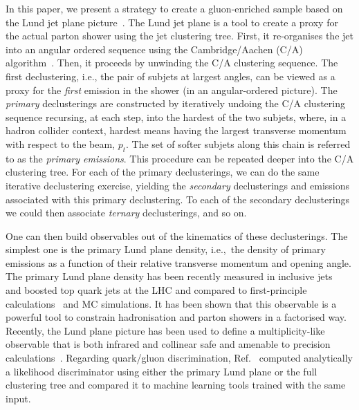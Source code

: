 \documentclass[a4paper,11pt]{article}
\begin{document}
In this paper, we present a strategy to create a gluon-enriched sample based on the Lund jet plane picture~\cite{Andersson:1988gp,Dreyer:2018nbf}. The Lund jet plane is a tool to create a proxy for the actual parton shower using the jet clustering tree. First, it re-organises the jet into an angular ordered sequence using the Cambridge/Aachen (C/A) algorithm~\cite{Dokshitzer:1997in}. Then, it proceeds by unwinding the C/A clustering sequence. The first declustering, i.e., the pair of subjets at largest angles, can be viewed as a proxy for the \textit{first} emission in the shower (in an angular-ordered picture). 
%
The \textit{primary} declusterings are constructed by iteratively undoing the C/A clustering sequence recursing, at each step, into the hardest of the two subjets, where, in a hadron collider context, hardest means having the largest transverse momentum with respect to the beam, $p_t$. The set of softer subjets along this chain is referred to as the \textit{primary emissions}.
%
This procedure can be repeated deeper into the C/A clustering tree. For each of the primary declusterings, we can do the same iterative declustering exercise, yielding the \textit{secondary} declusterings and emissions associated with this primary declustering. To each of the secondary declusterings we could then associate \textit{ternary} declusterings, and so on.

One can then build observables out of the kinematics of these declusterings. The simplest one is the primary Lund plane density, i.e.,\ the density of primary emissions as a function of their relative transverse momentum and opening angle. The primary Lund plane density has been recently measured in inclusive jets~\cite{ATLAS:2020bbn,CMS:2023lpp} and boosted top quark jets \cite{ATLAS:2024dua} at the LHC and compared to first-principle calculations~\cite{Lifson:2020gua} and MC simulations. It has been shown that this observable is a powerful tool to constrain hadronisation and parton showers in a factorised way. Recently, the Lund plane picture has been used to define a multiplicity-like observable that is both infrared and collinear safe and amenable to precision calculations~\cite{Medves:2022ccw,Medves:2022uii,ATLAS:2024wrd}. Regarding quark/gluon discrimination, Ref.~\cite{Dreyer:2021hhr}
computed analytically a likelihood discriminator using either the primary Lund plane or the full clustering tree and compared it to machine learning tools trained with the same input. 
\end{document}
